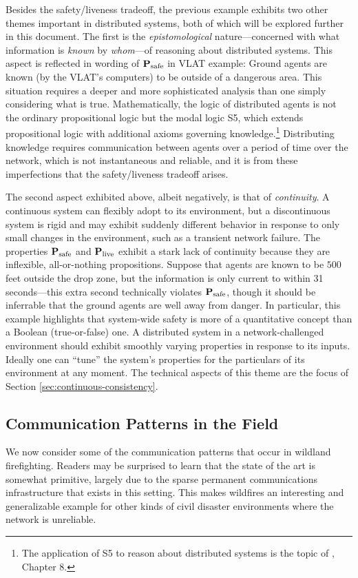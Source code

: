 \documentclass[]             %
{NASA}                       %
\theoremstyle{definition}
\begin{document}
Besides the safety/liveness tradeoff, the previous example exhibits
two other themes important in distributed systems, both of which will
be explored further in this document. The first is the
\emph{epistomological} nature---concerned with what information is
\emph{known} by \emph{whom}---of reasoning about distributed
systems. This aspect is reflected in wording of $\textbf{P}_\textrm{safe}$ in VLAT
example: Ground agents are known (by the VLAT's computers) to be
outside of a dangerous area. This situation requires a deeper and more
sophisticated analysis than one simply considering what is
true. Mathematically, the logic of distributed agents is not the
ordinary propositional logic but the modal logic S5, which extends
propositional logic with additional axioms governing
knowledge.\footnote{The application of S5 to reason about distributed
  systems is the topic of \cite{kshemkalyani_singhal_2008}, Chapter
  8.} Distributing knowledge requires communication between agents
over a period of time over the network, which is not instantaneous and
reliable, and it is from these imperfections that the safety/liveness
tradeoff arises.

The second aspect exhibited above, albeit negatively, is that of
\emph{continuity}. A continuous system can flexibly adopt to its
environment, but a discontinuous system is rigid and may exhibit
suddenly different behavior in response to only small changes in the
environment, such as a transient network failure. The properties
$\textbf{P}_\textrm{safe}$ and $\textbf{P}_\textrm{live}$ exhibit a stark lack of continuity because they
are inflexible, all-or-nothing propositions. Suppose that agents are
known to be $500$ feet outside the drop zone, but the information is
only current to within 31 seconds---this extra second technically
violates $\textbf{P}_\textrm{safe}$, though it should be inferrable that the ground
agents are well away from danger. In particular, this example
highlights that system-wide safety is more of a quantitative concept
than a Boolean (true-or-false) one. A distributed system in a
network-challenged environment should exhibit smoothly varying
properties in response to its inputs. Ideally one can ``tune'' the
system's properties for the particulars of its environment at any
moment. The technical aspects of this theme are the focus of Section
\ref{sec:continuous-consistency}.

\subsection{Communication Patterns in the Field}
\label{ssec:communication-patterns}
We now consider some of the communication patterns that occur in
wildland firefighting. Readers may be surprised to learn that the
state of the art is somewhat primitive, largely due to the sparse
permanent communications infrastructure that exists in this
setting. This makes wildfires an interesting and generalizable example
for other kinds of civil disaster environments where the network is
unreliable.
\end{document}
